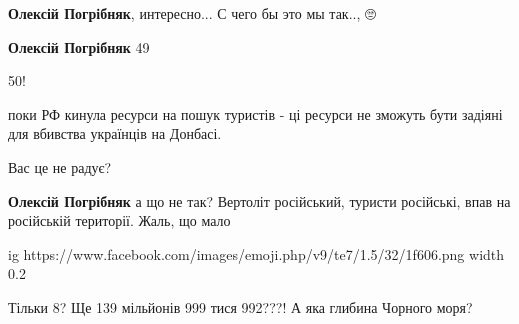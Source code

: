 \begin{itemize}
 
\textbf{Олексій Погрібняк}, интересно... С чего бы это мы так.., 🙄🤔

 
\textbf{Олексій Погрібняк}
49🤣🤣🤣

 
50!

 

поки РФ кинула ресурси на пошук туристів - ці ресурси не зможуть бути задіяні
для вбивства українців на Донбасі.

Вас це не радує?


 
\textbf{Олексій Погрібняк} а що не так? Вертоліт російський, туристи російські, впав на російській території. Жаль, що мало


\ifcmt
  ig https://www.facebook.com/images/emoji.php/v9/te7/1.5/32/1f606.png
  width 0.2
\fi

 
Тільки 8? Ще 139 мільйонів 999 тися 992???! А яка глибина Чорного моря?


\end{itemize}

